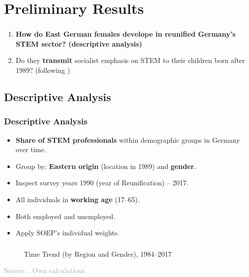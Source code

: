\documentclass[11pt, aspectratio=1610, xcolor={dvipsnames}]{beamer}
\newcommand{\highlight}[1]{\textbf{\textcolor{PineGreen}{#1}}}
\begin{document}
	\section{Preliminary Results}
	\begin{frame}
		\frametitle{}
		
		\begin{enumerate}
			\item \textbf{How do East German females develope in \highlight{reunified Germany's STEM sector}? (descriptive analysis)}
			\item Do they \highlight{transmit} socialist emphasis on STEM to their children born after 1989? (following \cite{Fernandez2011})
		\end{enumerate}
		
	\end{frame}
	
	\subsection{Descriptive Analysis}
	\begin{frame}
		\frametitle{Descriptive Analysis}
		
		\begin{itemize}
			\item \highlight{Share of STEM professionals} within demographic groups in Germany over time.
			\item Group by: \highlight{Eastern origin} (location in 1989) and \highlight{gender}.
			\item Inspect survey years 1990 (year of Reunification) -- 2017.
			\item All individuals in \highlight{working age} (17--65).
			\item Both employed and unemployed.
			\item Apply SOEP's individual weights.
		\end{itemize}
		
	\end{frame}
		
	\begin{frame}
		\frametitle{}
		
		\begin{figure}[h]
			\centering
			\caption{Time Trend (by Region and Gender), 1984--2017}
			\label{fig:trend}
			\resizebox{75mm}{!}{}
		\end{figure}
		
		{\scriptsize
			\textcolor{darkgray}{Source: \cite{SOEP2023}. Own calculations.}
		}
	
	\end{frame}
	
\end{document}
